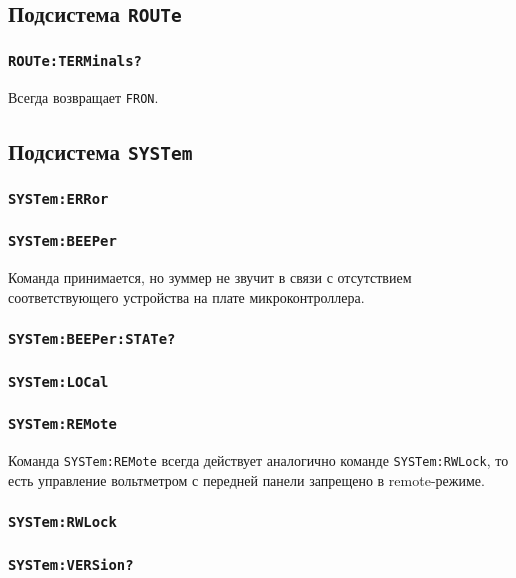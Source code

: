 \documentclass[12pt, a4paper]{article}
\newcommand{\CMD}[1]{{\tt #1}}
\newcommand{\SUBSYSTEMSECTION}[1]{\subsection{Подсистема \CMD{#1}}}
\newcommand{\CMDSECTION}[1]{\subsubsection*{\CMD{#1}}}
\begin{document}
\SUBSYSTEMSECTION{ROUTe}

\CMDSECTION{ROUTe:TERMinals?}

Всегда возвращает \CMD{FRON}.

\SUBSYSTEMSECTION{SYSTem}

\CMDSECTION{SYSTem:ERRor}
\CMDSECTION{SYSTem:BEEPer}

Команда принимается, но зуммер не звучит в связи с отсутствием соответствующего устройства на плате микроконтроллера.

\CMDSECTION{SYSTem:BEEPer:STATe?}
\CMDSECTION{SYSTem:LOCal}
\CMDSECTION{SYSTem:REMote}

Команда \CMD{SYSTem:REMote} всегда действует аналогично команде \CMD{SYSTem:RWLock}, то есть управление вольтметром с передней панели запрещено в remote-режиме.

\CMDSECTION{SYSTem:RWLock}
\CMDSECTION{SYSTem:VERSion?}
\end{document}
